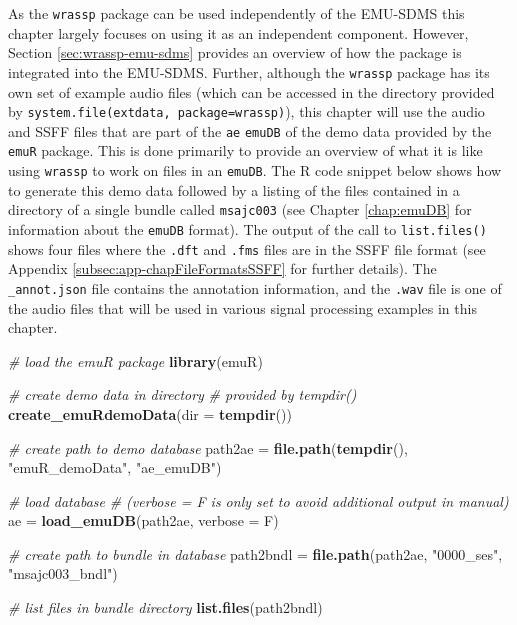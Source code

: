 \documentclass[]{book}
\newenvironment{Shaded}{\begin{snugshade}}{\end{snugshade}}
\newcommand{\CommentTok}[1]{\textcolor[rgb]{0.56,0.35,0.01}{\textit{#1}}}
\newcommand{\DataTypeTok}[1]{\textcolor[rgb]{0.13,0.29,0.53}{#1}}
\newcommand{\KeywordTok}[1]{\textcolor[rgb]{0.13,0.29,0.53}{\textbf{#1}}}
\newcommand{\NormalTok}[1]{#1}
\newcommand{\StringTok}[1]{\textcolor[rgb]{0.31,0.60,0.02}{#1}}
\begin{document}
As the \texttt{wrassp} package can be used independently of the EMU-SDMS this chapter largely focuses on using it as an independent component. However, Section \ref{sec:wrassp-emu-sdms} provides an overview of how the package is integrated into the EMU-SDMS. Further, although the \texttt{wrassp} package has its own set of example audio files (which can be accessed in the directory provided by \texttt{system.file(\textquotesingle{}extdata\textquotesingle{},\ package=\textquotesingle{}wrassp\textquotesingle{})}), this chapter will use the audio and SSFF files that are part of the \texttt{ae} \texttt{emuDB} of the demo data provided by the \texttt{emuR} package. This is done primarily to provide an overview of what it is like using \texttt{wrassp} to work on files in an \texttt{emuDB}. The R code snippet below shows how to generate this demo data followed by a listing of the files contained in a directory of a single bundle called \texttt{msajc003} (see Chapter \ref{chap:emuDB} for information about the \texttt{emuDB} format). The output of the call to \texttt{list.files()} shows four files where the \texttt{.dft} and \texttt{.fms} files are in the SSFF file format (see Appendix \ref{subsec:app-chapFileFormatsSSFF} for further details). The \texttt{\_annot.json} file contains the annotation information, and the \texttt{.wav} file is one of the audio files that will be used in various signal processing examples in this chapter.

\begin{Shaded}
\begin{Highlighting}[]
\CommentTok{# load the emuR package}
\KeywordTok{library}\NormalTok{(emuR)}

\CommentTok{# create demo data in directory}
\CommentTok{# provided by tempdir()}
\KeywordTok{create_emuRdemoData}\NormalTok{(}\DataTypeTok{dir =} \KeywordTok{tempdir}\NormalTok{())}

\CommentTok{# create path to demo database}
\NormalTok{path2ae =}\StringTok{ }\KeywordTok{file.path}\NormalTok{(}\KeywordTok{tempdir}\NormalTok{(), }\StringTok{"emuR_demoData"}\NormalTok{, }\StringTok{"ae_emuDB"}\NormalTok{)}

\CommentTok{# load database}
\CommentTok{# (verbose = F is only set to avoid additional output in manual)}
\NormalTok{ae =}\StringTok{ }\KeywordTok{load_emuDB}\NormalTok{(path2ae, }\DataTypeTok{verbose =}\NormalTok{ F)}

\CommentTok{# create path to bundle in database}
\NormalTok{path2bndl =}\StringTok{ }\KeywordTok{file.path}\NormalTok{(path2ae, }\StringTok{"0000_ses"}\NormalTok{, }\StringTok{"msajc003_bndl"}\NormalTok{)}

\CommentTok{# list files in bundle directory}
\KeywordTok{list.files}\NormalTok{(path2bndl)}
\end{Highlighting}
\end{Shaded}
\end{document}
